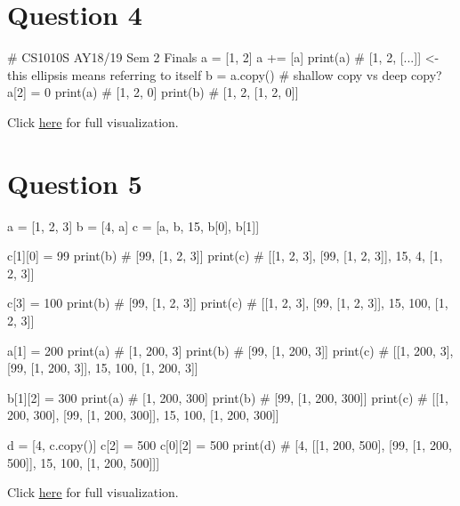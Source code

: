\section{Question 4}
\begin{python}
# CS1010S AY18/19 Sem 2 Finals
a = [1, 2]
a += [a]
print(a) # [1, 2, [...]] <- this ellipsis means referring to itself
b = a.copy() # shallow copy vs deep copy?
a[2] = 0
print(a) # [1, 2, 0]
print(b) # [1, 2, [1, 2, 0]]
\end{python}
Click \href{https://pythontutor.com/visualize.html#code=a%20%3D%20%5B1,%202%5D%0Aa%20%2B%3D%20%5Ba%5D%0Aprint%28a%29%0Ab%20%3D%20a.copy%28%29%20%23%20shallow%20copy%20vs%20deep%20copy%3F%0Aa%5B2%5D%20%3D%200%0Aprint%28a%29%0Aprint%28b%29&cumulative=false&curInstr=0&heapPrimitives=nevernest&mode=display&origin=opt-frontend.js&py=3&rawInputLstJSON=%5B%5D&textReferences=false}{\underline{here}} for full visualization.

\section{Question 5}
\begin{python}
a = [1, 2, 3]
b = [4, a]
c = [a, b, 15, b[0], b[1]]

c[1][0] = 99
print(b) # [99, [1, 2, 3]]
print(c) # [[1, 2, 3], [99, [1, 2, 3]], 15, 4, [1, 2, 3]]

c[3] = 100
print(b) # [99, [1, 2, 3]]
print(c) # [[1, 2, 3], [99, [1, 2, 3]], 15, 100, [1, 2, 3]]

a[1] = 200
print(a) # [1, 200, 3]
print(b) # [99, [1, 200, 3]]
print(c) # [[1, 200, 3], [99, [1, 200, 3]], 15, 100, [1, 200, 3]]

b[1][2] = 300
print(a) # [1, 200, 300]
print(b) # [99, [1, 200, 300]]
print(c) # [[1, 200, 300], [99, [1, 200, 300]], 15, 100, [1, 200, 300]]

d = [4, c.copy()]
c[2] = 500
c[0][2] = 500
print(d) # [4, [[1, 200, 500], [99, [1, 200, 500]], 15, 100, [1, 200, 500]]]
\end{python}
Click \href{https://pythontutor.com/visualize.html#code=a%20%3D%20%5B1,%202,%203%5D%0Ab%20%3D%20%5B4,%20a%5D%0Ac%20%3D%20%5Ba,%20b,%2015,%20b%5B0%5D,%20b%5B1%5D%5D%0A%0Ac%5B1%5D%5B0%5D%20%3D%2099%0Aprint%28b%29%0Aprint%28c%29%0A%0Ac%5B3%5D%20%3D%20100%0Aprint%28b%29%0Aprint%28c%29%0A%0Aa%5B1%5D%20%3D%20200%0Aprint%28a%29%0Aprint%28b%29%0Aprint%28c%29%0A%0Ab%5B1%5D%5B2%5D%20%3D%20300%0Aprint%28a%29%0Aprint%28b%29%0Aprint%28c%29%0A%0Ad%20%3D%20%5B4,%20c.copy%28%29%5D%0Ac%5B2%5D%20%3D%20500%0Ac%5B0%5D%5B2%5D%20%3D%20500%0Aprint%28d%29&cumulative=false&curInstr=0&heapPrimitives=nevernest&mode=display&origin=opt-frontend.js&py=3&rawInputLstJSON=%5B%5D&textReferences=false}{\underline{here}} for full visualization.

